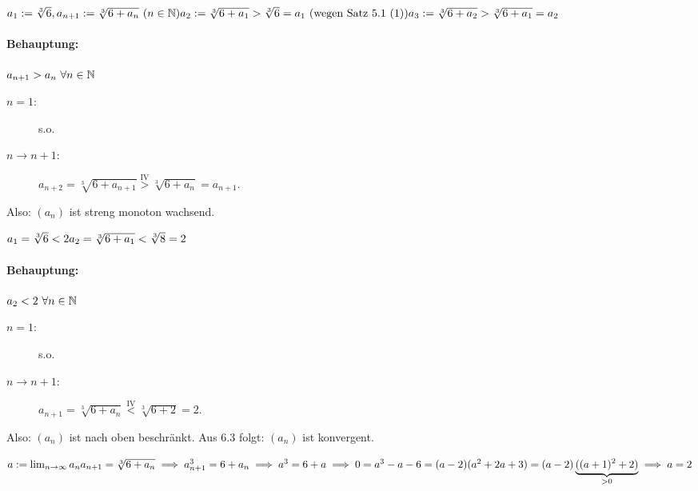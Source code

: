 \documentclass[a4paper,twoside,DIV15,BCOR12mm]{scrbook}
\begin{document}
\begin{beispiel}
\begin{math}
a_1:=\sqrt[3]{6}, a_{n+1}:=\sqrt[3]{6+a_n}\ (n\in\mathbb{N})\\
a_2:=\sqrt[3]{6+a_1} > \sqrt[3]{6}=a_1\text{ (wegen Satz 5.1 (1))}\\
a_3:=\sqrt[3]{6+a_2} > \sqrt[3]{6+a_1}=a_2
\end{math}

\paragraph{Behauptung:}
$a_{n+1}>a_n\ \forall n\in\mathbb{N}$

\begin{beweis}
\begin{description}
\item[$n=1$:] s.o.
\item[$n\longrightarrow n+1$:] $a_{n+2}=\sqrt[3]{6+a_{n+1}} \stackrel{\text{IV}}{>} \sqrt[3]{6+a_n}=a_{n+1}.$
\end{description}
\end{beweis}

Also: $(a_n)$ ist streng monoton wachsend.

\begin{math}
a_1=\sqrt[3]{6} < 2\\
a_2=\sqrt[3]{6+a_1} < \sqrt[3]{8}=2
\end{math}

\paragraph{Behauptung:}
$a_2<2\ \forall n\in\mathbb{N}$

\begin{beweis}
\begin{description}
\item[$n=1$:] s.o.
\item[$n\longrightarrow n+1$:] $a_{n+1}=\sqrt[3]{6+a_n} \stackrel{\text{IV}}{<} \sqrt[3]{6+2}=2.$
\end{description}
\end{beweis}

Also: $(a_n)$ ist nach oben beschränkt. Aus 6.3 folgt: $(a_n)$ ist konvergent.

\begin{math}
a:=\lim_{n\rightarrow\infty}{a_n}\\
a_{n+1}=\sqrt[3]{6+a_n} \implies a_{n+1}^3=6+a_n \implies a^3=6+a\\
\implies 0=a^3-a-6=(a-2)(a^2+2a+3)=(a-2)\underbrace{((a+1)^2+2)}_{>0} \implies a=2
\end{math}
\end{beispiel}
\end{document}

